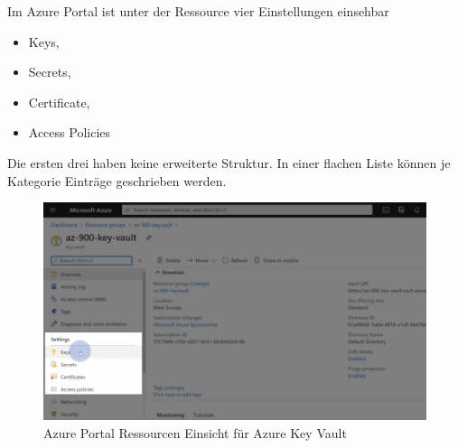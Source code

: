 Im Azure Portal ist unter der Ressource vier Einstellungen einsehbar
\begin{itemize}
	\item Keys,
	\item Secrets,
	\item Certificate,
	\item Access Policies
\end{itemize}

Die ersten drei haben keine erweiterte Struktur. In einer flachen Liste können je Kategorie Einträge geschrieben werden.
\begin{figure}[H]
	\centering
	\includegraphics[scale = 0.2]{attachment/chapter_2/Scc132}
	\caption{Azure Portal Ressourcen Einsicht für Azure Key Vault}
\end{figure}

